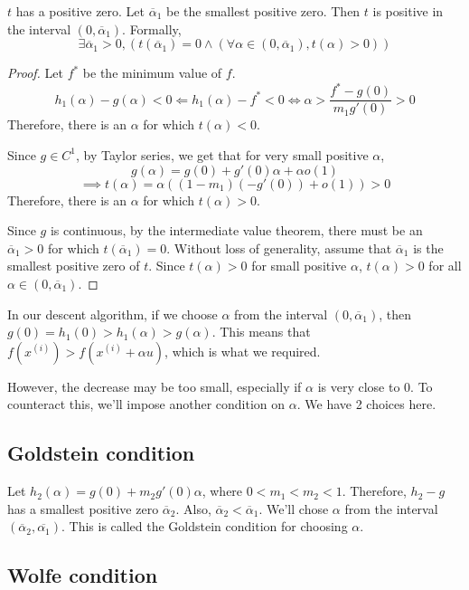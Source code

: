 \begin{lemma}
$t$ has a positive zero. Let $\overline{\alpha}_1$ be the smallest positive zero.
Then $t$ is positive in the interval $(0, \overline{\alpha}_1)$. Formally,
\[ \exists \overline{\alpha}_1 > 0, (t(\overline{\alpha}_1) = 0 \wedge
(\forall \alpha \in (0, \overline{\alpha}_1), t(\alpha) > 0)) \]
\end{lemma}
\begin{proof}
Let $f^*$ be the minimum value of $f$.
\[ h_1(\alpha) - g(\alpha) < 0 \Leftarrow h_1(\alpha) - f^* < 0 \iff \alpha > \frac{f^* - g(0)}{m_1g'(0)} > 0 \]
Therefore, there is an $\alpha$ for which $t(\alpha) < 0$.

Since $g \in C^1$, by Taylor series, we get that for very small positive $\alpha$,
\[ g(\alpha) = g(0) + g'(0)\alpha + \alpha o(1) \]
\[ \implies t(\alpha) = \alpha( (1-m_1)(-g'(0)) + o(1) ) > 0 \]
Therefore, there is an $\alpha$ for which $t(\alpha) > 0$.

Since $g$ is continuous, by the intermediate value theorem,
there must be an $\overline{\alpha}_1 > 0$ for which $t(\overline{\alpha}_1) = 0$.
Without loss of generality, assume that $\overline{\alpha}_1$ is the smallest positive zero of $t$.
Since $t(\alpha) > 0$ for small positive $\alpha$,
$t(\alpha) > 0$ for all $\alpha \in (0, \overline{\alpha}_1)$.
\end{proof}

In our descent algorithm, if we choose $\alpha$ from the interval $(0, \overline{\alpha}_1)$,
then $g(0) = h_1(0) > h_1(\alpha) > g(\alpha)$. This means that
$f(x^{(i)}) > f(x^{(i)} + \alpha u)$, which is what we required.

However, the decrease may be too small, especially if $\alpha$ is very close to 0.
To counteract this, we'll impose another condition on $\alpha$.
We have 2 choices here.

\subsection{Goldstein condition}

Let $h_2(\alpha) = g(0) + m_2 g'(0) \alpha$, where $0 < m_1 < m_2 < 1$.
Therefore, $h_2 - g$ has a smallest positive zero $\overline{\alpha}_2$.
Also, $\overline{\alpha}_2 < \overline{\alpha}_1$.
We'll chose $\alpha$ from the interval $(\overline{\alpha}_2, \overline{\alpha_1})$.
This is called the Goldstein condition for choosing $\alpha$.

\subsection{Wolfe condition}

